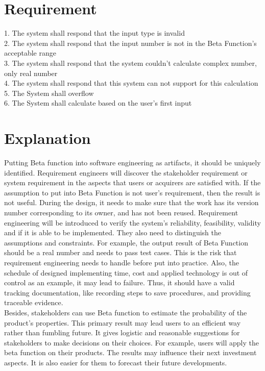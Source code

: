 \documentclass{article}
\begin{document}
\section{Requirement}
 
1.	The system shall respond that the input type is invalid \\
2.	The system shall respond that the input number is not in the Beta Function’s acceptable range \\
3.	The system shall respond that the system couldn’t calculate complex number, only real number \\
4.	The system shall respond that this system can not support for this calculation  \\
5.	The System shall overflow \\
6.  The System shall calculate based on the user's first input \\

\section{Explanation}
Putting Beta function into software engineering as artifacts, it should be uniquely identified. Requirement engineers will discover the stakeholder requirement or system requirement in the aspects that users or acquirers are satisfied with. If the assumption to put into Beta Function is not user’s requirement, then the result is not useful. During the design, it needs to make sure that the work has its version number corresponding to its owner, and has not been reused. Requirement engineering will be introduced to verify the system’s reliability, feasibility, validity and if it is able to be implemented. They also need to distinguish the assumptions and constraints. For example, the output result of Beta Function should be a real number and needs to pass test cases. This is the risk that requirement engineering needs to handle before put into practice. Also, the schedule of designed implementing time, cost and applied technology is out of control as an example, it may lead to failure. Thus, it should have a valid tracking documentation, like recording steps to save procedures, and providing traceable evidence. \\
Besides, stakeholders can use Beta function to estimate the probability of the product’s properties. This primary result may lead users to an efficient way rather than fumbling future. It gives logistic and reasonable suggestions for stakeholders to make decisions on their choices. For example, users will apply the beta function on their products. The results may influence their next investment aspects. It is also easier for them to forecast their future developments. \\
\end{document}

